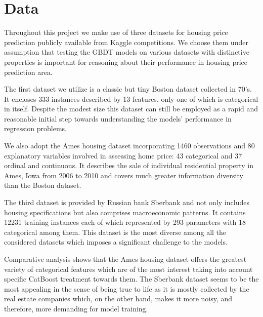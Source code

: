 \section{Data}
\label{sec:data}
Throughout this project we make use of three datasets for housing price prediction publicly available from Kaggle competitions. We choose them under assumption that testing the GBDT models on various datasets with distinctive properties is important for reasoning about their performance in housing price prediction area. 

The first dataset we utilize is a classic but tiny Boston dataset \cite{boston1978housing} collected in 70's. It encloses 333 instances described by 13 features, only one of which is categorical in itself. Despite the modest size this dataset can still be employed as a rapid and reasonable initial step towards understanding the models' performance in regression problems.

We also adopt the Ames housing dataset \cite{de2011ames} incorporating 1460 observations and 80 explanatory variables involved in assessing home price: 43 categorical and 37 ordinal and continuous. It describes the sale of individual residential property in Ames, Iowa from 2006 to 2010 and covers much greater information diversity than the Boston dataset.

The third dataset is provided by Russian bank Sberbank \cite{sberbank2017housing} and not only includes housing specifications but also comprises macroeconomic patterns. It contains 12231 training instances each of which represented by 293 parameters with 18 categorical among them. This dataset is the most diverse among all the considered datasets which imposes a significant challenge to the models.

Comparative analysis shows that the Ames housing dataset offers the greatest variety of categorical features which are of the most interest taking into account specific CatBoost treatment towards them. The Sberbank dataset seems to be the most appealing in the sense of being true to life as it is mostly collected by the real estate companies which, on the other hand, makes it more noisy, and therefore, more demanding for model training.